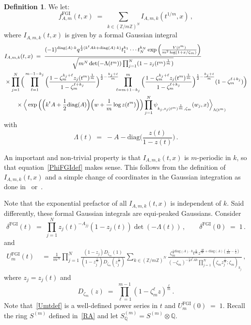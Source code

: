 \documentclass[12pt,reqno]{amsart}
\theoremstyle{definition}
\newtheorem{definition}[proposition]{Definition}
\def\BZ{\mathbb Z}
\def\BQ{\mathbb Q}
\def\be{\begin{equation}}
\def\ee{\end{equation}}
\def\z{\zeta}
\def\diag{\mathrm{diag}}
\def\={\;=\;}
\def\FGI{\mathrm{FGI}}
\def\Phitof{f}
\begin{document}
\begin{definition}
\label{def.FGI}
We let:
\be
\label{PhiFGIdef}
\Phitof_{A,m}^\FGI(t,x) \= \sum_{k \in (\BZ/m\BZ)^N}  I_{A,m,k}(t^{1/m},x)\,,
\ee
where $I_{A,m,k}(t,x)$ is given by a formal Gaussian integral
\be
\label{Ikdef}
\begin{small}
\begin{aligned}
&I_{A,m,k}(t,x)
\=\frac{(-1)^{\mathrm{diag}(A)\cdot k}
  q^{\frac{1}{2}(k^t A k + \mathrm{diag}(A)\cdot k)}t_1^{k_1}
\cdots t_{N}^{k_N}
\exp\Big(\frac{V(t^{m})}{m^2\log(1+x/\z_m)}\Big)}{\sqrt{m^N
  \det(-\Lambda(t^m))\prod_{j=1}^{N}(1-z_{j}(t^{m})^{\frac{1}{m}})}}\\
&\times\prod_{j=1}^{N}\Big(
\prod_{\ell=1}^{m-1-k_j}
\Big(\frac{1-\z_m^{k_{j}+\ell}z_{j}(t^{m})^{\frac{1}{m}}}{1-\z_m^{\ell+k_j}}
\Big)^{\frac{1}{2}-\frac{k_{j}+\ell}{m}}\!\!\!\!
\prod_{\ell=m+1-k_j}^{m}
\Big(\frac{1-\z_m^{k_{j}+\ell}z_{j}(t^{m})^{\frac{1}{m}}}{1-\z_m^{\ell+k_j}}
\Big)^{\frac{1}{2}-\frac{k_{j}+\ell}{m}}
(1-\z_m^{\ell+k_j})\Big)\\
&\qquad\times\Big\langle
\exp\Big(\Big(k^{t}A+\frac{1}{2}\mathrm{diag}(A)\Big)
\Big(w+\frac{1}{m}\log z(t^{m})\Big)\Big)
\prod_{j=1}^{N}
\psi_{k_j,z_{j}(t^{m})^{\frac{1}{m}},\z_m}(w_j,x)
\Big\rangle_{\Lambda(t^{m})}
\end{aligned}
\end{small}
\ee
with
\be
\label{lt}
\Lambda(t)\=-A-\mathrm{diag}\Big(\frac{z(t)}{1-z(t)}\Big) \,.
\ee
\end{definition}
An important and non-trivial property is that $I_{A,m,k}(t,x)$ is $m$-periodic
in $k$, so that equation~\eqref{PhiFGIdef} makes sense. This follows from the
definition of $I_{A,m,k}(t,x)$ and a simple change of coordinates in the Gaussian
integration as done in~\cite{AarhusII} or~\cite{GSW}.

Note that the exponential prefactor of all $I_{A,m,k}(t,x)$ is independent of $k$.
Said differently, these formal Gaussian integrals are equi-peaked Gaussians.
Consider
\be
\label{dt}
\delta^\FGI(t)\= \prod_{j=1}^Nz_j(t)^{-A_{jj}}(1-z_j(t)) \det(-\Lambda(t))\,,\qquad
\delta^\FGI(0)\=1 \,.
\ee
and 
\be
\begin{aligned}
\label{Umtdef}
U_m^\FGI(t) &\= \frac{1}{m^N}
\prod_{j=1}^{N}\frac{(1-z_{j})D_{\z_m}(1)}{(1-z_{j}^{\frac{1}{m}})
D_{\z_m}(z_{j}^{\frac{1}{m}})}
\sum_{k \in (\BZ/m\BZ)^N}
\frac{
\z_m^{\frac{1}{2}\mathrm{diag}(A)\cdot k}
t^{\frac{k}{m}}z^{\frac{Ak}{m}+\diag(A)(\frac{1}{2m}-\frac{1}{2})}}
{(-\z_m)^{-\frac{1}{2}k^{t}Ak}\prod_{j=1}^{N}(\z_mz_{j}^{\frac{1}{m}};\z_m)_{k_j}}\,,
\end{aligned}
\ee
where $z_j=z_j(t)$ and 
\be\label{cycdl}
D_{\z_m}(z)
\=
\prod_{\ell=1}^{m-1}
(1-\z_m^{\ell}z)^{\frac{\ell}{m}}\,.
\ee
Note that~\eqref{Umtdef} is a well-defined power series in $t$ and $U_m^\FGI(0) \=1$.
Recall the ring $S^{(m)}$ defined in~\eqref{RA} and let
$S^{(m)}_\BQ=S^{(m)} \otimes \BQ$. 
\end{document}
